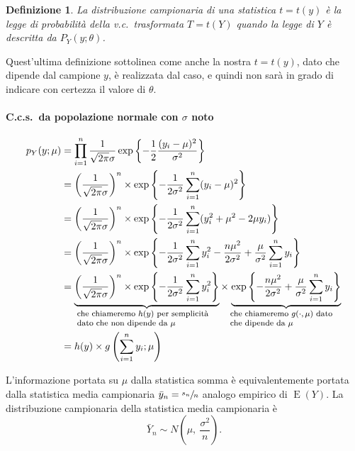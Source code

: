 \documentclass[11pt,a4paper,twoside]{article}
\newtheorem{definition}{Definizione}
\newcommand{\explain}[2]{\underbrace{#1}_{\parbox{\widthof{\ensuremath{#1}}}{\footnotesize\raggedright #2}}}
\DeclareMathOperator{\E}{E}
\begin{document}
\begin{definition}
  La distribuzione campionaria di una statistica \(t = t(y)\) è la
  legge di probabilità della v.c.\ trasformata \(T = t(Y)\) quando la
  legge di \(Y\) è descritta da \(P_Y(y; \theta)\).
\end{definition}

Quest'ultima definizione sottolinea come anche la nostra \(t = t(y)\),
dato che dipende dal campione \(y\), è realizzata dal caso, e quindi
non sarà in grado di indicare con certezza il valore di \(\theta\).

\paragraph{C.c.s.\ da popolazione normale con \(\sigma\) noto}
\begin{align*}
  p_Y(y; \mu)
  &= \prod_{i=1}^n \frac{1}{\sqrt{2\pi} \sigma} \exp\left\{ -\frac{1}2
    \frac{(y_i - \mu)^2}{\sigma^2} \right\} \\
  &= \left( \frac{1}{\sqrt{2 \pi} \sigma} \right)^n \times
    \exp\left\{ -\frac{1}{2\sigma^2} \sum_{i=1}^n (y_i - \mu)^2 \right\} \\
  &= \left( \frac{1}{\sqrt{2\pi} \sigma} \right)^n \times
    \exp\left\{ -\frac{1}{2\sigma^2} \sum_{i=1}^n (y_i^2 + \mu^2 -2\mu y_i) \right\} \\
  &= \left( \frac{1}{\sqrt{2\pi} \sigma} \right)^n \times
    \exp\left\{ -\frac{1}{2\sigma^2} \sum_{i=1}^n y_i^2 - \frac{n \mu^2}{2\sigma^2} + \frac{\mu}{\sigma^2} \sum_{i=1}^n y_i \right\} \\
  &= \explain{
    \left( \frac{1}{\sqrt{2\pi} \sigma} \right)^n \times \exp\left\{
    -\frac{1}{2\sigma^2} \sum_{i=1}^n y_i^2\right\}
    }{che chiameremo \(h(y)\) per semplicità dato che non dipende da \(\mu\)}
    \times
    \explain{
    \exp\left\{  - \frac{n \mu^2}{2\sigma^2} + \frac{\mu}{\sigma^2} \sum_{i=1}^n y_i\right\}
    }{che chiameremo \(g(\cdot, \mu)\) dato che dipende da \(\mu\)} \\
  &= h(y) \times g\left( \sum_{i=1}^n y_i; \mu \right)
\end{align*}

L'informazione portata su \(\mu\) dalla statistica somma è
equivalentemente portata dalla statistica media campionaria
\(\bar{y}_n = \sfrac{s_n}{n}\) analogo empirico di \(\E(Y)\).  La
distribuzione campionaria della statistica media campionaria è
\[
  \bar{Y}_n \sim N\left( \mu, \: \frac{\sigma^2}{n} \right) .
\]
\end{document}
